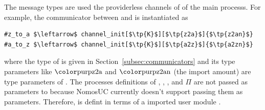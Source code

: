 The message types are used the providerless channels of of the main processs. For example, the communicator between \Z and \A is instantiated as
\begin{lstlisting}[basicstyle=\footnotesize\BeraMonottFamily, mathescape]
#z_to_a $\leftarrow$ channel_init[$\tp{K}$][$\tp{z2a}$]{$\tp{z2an}$}
#a_to_z $\leftarrow$ channel_init[$\tp{K}$][$\tp{a2z}$]{$\tp{a2zn}$}
\end{lstlisting}
where the type of  is given in Section~\ref{subsec:communicators} and its type parameters like $\tp{z2a}$ and $\tp{z2an}$ (the import amount) are type parameters of .
The processes definitions of \Z, \A, \F, and $\Pi$ are not passed as parameters to  because NomosUC currently doesn't support passing them as parameters. Therefore,  is defint in terms of a imported user module .

